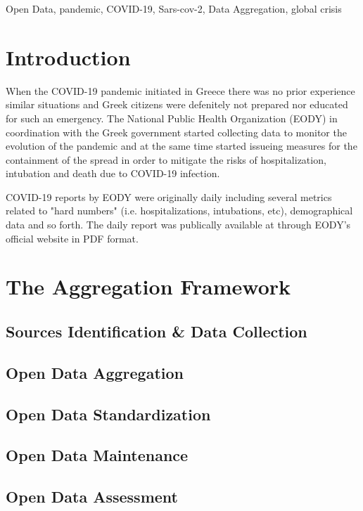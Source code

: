 \documentclass[10pt,a4paper]{article}
\begin{document}
Open Data, pandemic, COVID-19, Sars-cov-2, Data Aggregation, global crisis

\clearpage
\pagestyle{fancy}

\section*{Introduction}

When the COVID-19 pandemic initiated in Greece \cite{covid19_greece_wiki} there was no prior experience similar situations and Greek citizens were defenitely not prepared nor educated for such an emergency. The National Public Health Organization (EODY) in coordination with the Greek government started collecting data \cite{eody_epidemiological_reports} to monitor the evolution of the pandemic and at the same time started issueing measures for the containment of the spread in order to mitigate the risks of hospitalization, intubation and death due to COVID-19 infection.


COVID-19 reports by EODY were originally daily including several metrics related to "hard numbers" (i.e. hospitalizations, intubations, etc), demographical data and so forth. The daily report was publically available at through EODY's official website \cite{eody_epidemiological_reports} in PDF format. 

\section*{The Aggregation Framework}

\subsection*{Sources Identification \& Data Collection}

\subsection*{Open Data Aggregation}

\subsection*{Open Data Standardization}

\subsection*{Open Data Maintenance}

\subsection*{Open Data Assessment}
\end{document}
